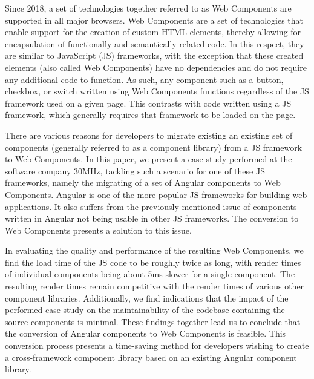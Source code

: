 Since 2018, a set of technologies together referred to as Web Components are supported in all major browsers. Web Components are a set of technologies that enable support for the creation of custom HTML elements, thereby allowing for encapsulation of functionally and semantically related code. In this respect, they are similar to JavaScript (JS) frameworks, with the exception that these created elements (also called Web Components) have no dependencies and do not require any additional code to function. As such, any component such as a button, checkbox, or switch written using Web Components functions regardless of the JS framework used on a given page. This contrasts with code written using a JS framework, which generally requires that framework to be loaded on the page.

There are various reasons for developers to migrate existing an existing set of components (generally referred to as a component library) from a JS framework to Web Components. In this paper, we present a case study performed at the software company 30MHz, tackling such a scenario for one of these JS frameworks, namely the migrating of a set of Angular components to Web Components. Angular is one of the more popular JS frameworks for building web applications. It also suffers from the previously mentioned issue of components written in Angular not being usable in other JS frameworks. The conversion to Web Components presents a solution to this issue.

In evaluating the quality and performance of the resulting Web Components, we find the load time of the JS code to be roughly twice as long, with render times of individual components being about 5ms slower for a single component. The resulting render times remain competitive with the render times of various other component libraries. Additionally, we find indications that the impact of the performed case study on the maintainability of the codebase containing the source components is minimal. These findings together lead us to conclude that the conversion of Angular components to Web Components is feasible. This conversion process presents a time-saving method for developers wishing to create a cross-framework component library based on an existing Angular component library.